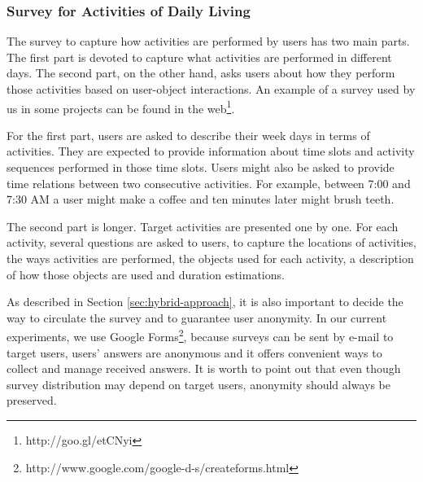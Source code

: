 \subsubsection{Survey for Activities of Daily Living}
\label{subsubsec:evaluation:survey}
\begin{comment}
 - Explain each of the questions of the survey
 - Show a screenshot and provide the link to the Google Form
 - Google Forms guarantee users' anonymity
 - Explain survey-script translation criteria
\end{comment}

The survey to capture how activities are performed by users has two main parts. The first part is devoted to capture what activities are performed in different days. The second part, on the other hand, asks users about how they perform those activities based on user-object interactions. An example of a survey used by us in some projects can be found in the web\footnote{http://goo.gl/etCNyi}.

For the first part, users are asked to describe their week days in terms of activities. They are expected to provide information about time slots and activity sequences performed in those time slots. Users might also be asked to provide time relations between two consecutive activities. For example, between 7:00 and 7:30 AM a user might make a coffee and ten minutes later might brush teeth. 

The second part is longer. Target activities are presented one by one. For each activity, several questions are asked to users, to capture the locations of activities, the ways activities are performed, the objects used for each activity, a description of how those objects are used and duration estimations.

As described in Section \ref{sec:hybrid-approach}, it is also important to decide the way to circulate the survey and to guarantee user anonymity. In our current experiments, we use Google Forms\footnote{http://www.google.com/google-d-s/createforms.html}, because surveys can be sent by e-mail to target users, users' answers are anonymous and it offers convenient ways to collect and manage received answers. It is worth to point out that even though survey distribution may depend on target users, anonymity should always be preserved. 


